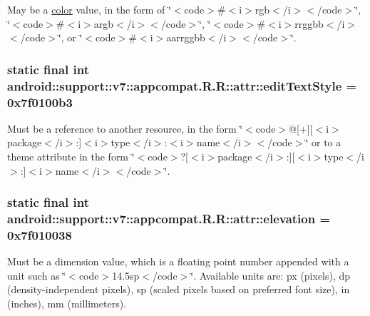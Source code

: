 May be a \hyperlink{classandroid_1_1support_1_1v7_1_1appcompat_1_1_r_1_1color}{color} value, in the form of \char`\"{}$<$code$>$\#$<$i$>$rgb$<$/i$>$$<$/code$>$\char`\"{}, \char`\"{}$<$code$>$\#$<$i$>$argb$<$/i$>$$<$/code$>$\char`\"{}, \char`\"{}$<$code$>$\#$<$i$>$rrggbb$<$/i$>$$<$/code$>$\char`\"{}, or \char`\"{}$<$code$>$\#$<$i$>$aarrggbb$<$/i$>$$<$/code$>$\char`\"{}. \hypertarget{classandroid_1_1support_1_1v7_1_1appcompat_1_1_r_1_1attr_ffde64fe5d66d56de18fc47a97451360}{
\subsubsection[{editTextStyle}]{\setlength{\rightskip}{0pt plus 5cm}static final int android::support::v7::appcompat.R.R::attr::editTextStyle = 0x7f0100b3}}
\label{classandroid_1_1support_1_1v7_1_1appcompat_1_1_r_1_1attr_ffde64fe5d66d56de18fc47a97451360}


Must be a reference to another resource, in the form \char`\"{}$<$code$>$@\mbox{[}+\mbox{]}\mbox{[}$<$i$>$package$<$/i$>$:\mbox{]}$<$i$>$type$<$/i$>$:$<$i$>$name$<$/i$>$$<$/code$>$\char`\"{} or to a theme attribute in the form \char`\"{}$<$code$>$?\mbox{[}$<$i$>$package$<$/i$>$:\mbox{]}\mbox{[}$<$i$>$type$<$/i$>$:\mbox{]}$<$i$>$name$<$/i$>$$<$/code$>$\char`\"{}. \hypertarget{classandroid_1_1support_1_1v7_1_1appcompat_1_1_r_1_1attr_6624b199480a289dfa0b1761b4418ca2}{
\subsubsection[{elevation}]{\setlength{\rightskip}{0pt plus 5cm}static final int android::support::v7::appcompat.R.R::attr::elevation = 0x7f010038}}
\label{classandroid_1_1support_1_1v7_1_1appcompat_1_1_r_1_1attr_6624b199480a289dfa0b1761b4418ca2}


Must be a dimension value, which is a floating point number appended with a unit such as \char`\"{}$<$code$>$14.5sp$<$/code$>$\char`\"{}. Available units are: px (pixels), dp (density-independent pixels), sp (scaled pixels based on preferred font size), in (inches), mm (millimeters). 

